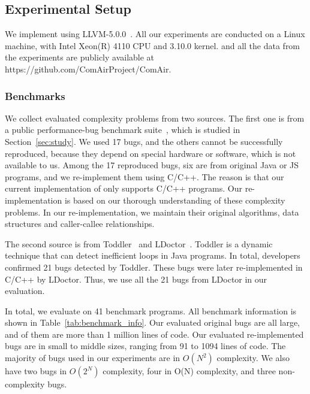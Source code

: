 \subsection{Experimental Setup}

We implement \Tool using LLVM-5.0.0~\cite{llvm}. 
All our experiments are conducted on a Linux machine, 
with Intel Xeon(R) 4110 CPU and 3.10.0 kernel.
\Tool and all the data from the experiments are publicly 
available at https://github.com/ComAirProject/ComAir.





\subsubsection{Benchmarks}

We collect evaluated complexity problems from two sources. 
The first one is
from a public performance-bug benchmark 
suite~\cite{PerfBug,SongOOPSLA2014,ldoctor}, which is
studied in Section~\ref{sec:study}.
We used 17 bugs, and the others cannot be successfully
reproduced, because they depend on special hardware 
or software, which is not available to us. 
Among the 17 reproduced bugs, six are from
original Java or JS programs, 
and we re-implement them using C/C++.
The reason is that our current implementation of \Tool 
only supports C/C++ programs.
Our re-implementation is based on our thorough 
understanding of these complexity problems.
In our re-implementation, we maintain 
their original algorithms, 
data structures and caller-callee relationships. 

The second source is from Toddler~\cite{Alabama} and LDoctor~\cite{ldoctor}. 
Toddler is a dynamic technique that can detect inefficient loops in Java programs.
In total, developers confirmed 21 bugs detected by Toddler. 
These bugs were later re-implemented in C/C++ by LDoctor. 
Thus, we use all the 21 bugs from LDoctor in our evaluation.  


In total, we evaluate \Tool on 41 benchmark programs. 
All benchmark information is shown in Table~\ref{tab:benchmark_info}. 
Our evaluated original bugs are all large, and  of them 
are more than 1 million lines of code.
Our evaluated re-implemented bugs are in small to middle sizes, 
ranging from 91 to 1094 lines of code. 
The majority of bugs used in our experiments are in $O(N^2)$ complexity. 
We also have two bugs in $O(2^N)$ complexity, four in O(N) complexity, 
and three non-complexity bugs.


